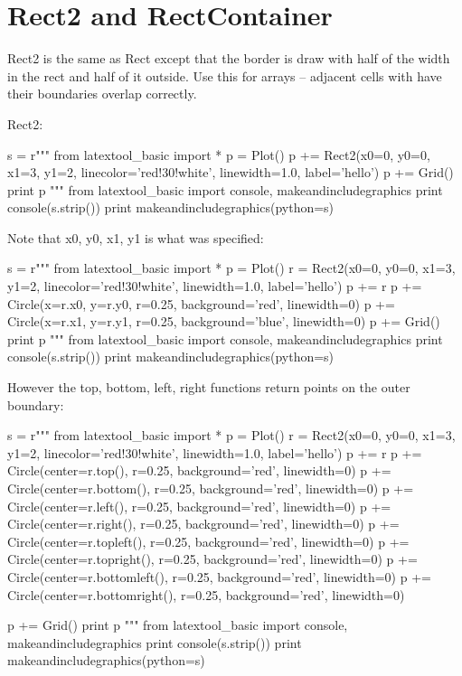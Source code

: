 \section{Rect2 and RectContainer}

Rect2 is the same as Rect except that the border is draw with half of the width
in the rect and half of it outside.
Use this for arrays -- adjacent cells with have their boundaries overlap
correctly.

Rect2:
\begin{python}
s = r"""
from latextool_basic import *
p = Plot()
p += Rect2(x0=0, y0=0, x1=3, y1=2, linecolor='red!30!white',
           linewidth=1.0, label='hello')
p += Grid()
print p
"""
from latextool_basic import console, makeandincludegraphics
print console(s.strip())
print makeandincludegraphics(python=s)
\end{python}






\begin{samepage}
Note that x0, y0, x1, y1 is what was specified:
\begin{python}
s = r"""
from latextool_basic import *
p = Plot()
r = Rect2(x0=0, y0=0, x1=3, y1=2, linecolor='red!30!white',
           linewidth=1.0, label='hello')
p += r
p += Circle(x=r.x0, y=r.y0, r=0.25, background='red', linewidth=0)
p += Circle(x=r.x1, y=r.y1, r=0.25, background='blue', linewidth=0)
p += Grid()
print p
"""
from latextool_basic import console, makeandincludegraphics
print console(s.strip())
print makeandincludegraphics(python=s)
\end{python}
\end{samepage}





\begin{samepage}
However the top, bottom, left, right functions return
points on the outer boundary:
\begin{python}
s = r"""
from latextool_basic import *
p = Plot()
r = Rect2(x0=0, y0=0, x1=3, y1=2, linecolor='red!30!white',
           linewidth=1.0, label='hello')
p += r
p += Circle(center=r.top(), r=0.25, background='red', linewidth=0)
p += Circle(center=r.bottom(), r=0.25, background='red', linewidth=0)
p += Circle(center=r.left(), r=0.25, background='red', linewidth=0)
p += Circle(center=r.right(), r=0.25, background='red', linewidth=0)
p += Circle(center=r.topleft(), r=0.25, background='red', linewidth=0)
p += Circle(center=r.topright(), r=0.25, background='red', linewidth=0)
p += Circle(center=r.bottomleft(), r=0.25, background='red', linewidth=0)
p += Circle(center=r.bottomright(), r=0.25, background='red', linewidth=0)

p += Grid()
print p
"""
from latextool_basic import console, makeandincludegraphics
print console(s.strip())
print makeandincludegraphics(python=s)
\end{python}
\end{samepage}


